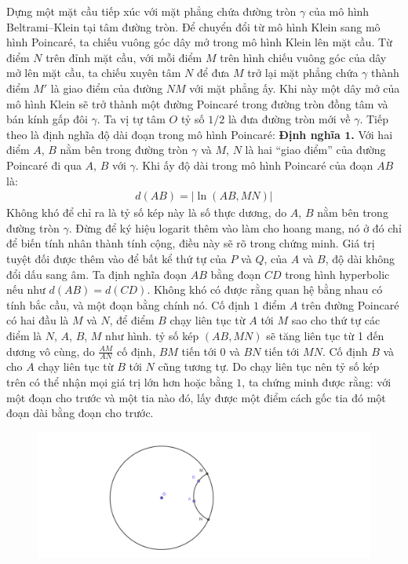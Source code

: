 \begin{multicols}{2}
\begin{figure}[H]
		\vspace*{-15pt}
	\end{figure}
	Dựng một mặt cầu tiếp xúc với mặt phẳng chứa đường tròn $\gamma$ của mô hình Beltrami--Klein tại tâm đường tròn. Để chuyển đổi từ mô hình Klein sang mô hình Poincar\'e, ta chiếu vuông góc dây mở trong mô hình Klein lên mặt cầu. Từ điểm $N$ trên đỉnh mặt cầu, với mỗi điểm $M$ trên hình chiếu vuông góc của dây mở lên mặt cầu, ta chiếu xuyên tâm $N$ để đưa $M$ trở lại mặt phẳng chứa $\gamma$ thành điểm $M'$ là giao điểm của đường $NM$ với mặt phẳng ấy. Khi này một dây mở của mô hình Klein sẽ trở thành một đường Poincar\'e trong đường tròn đồng tâm và bán kính gấp đôi $\gamma$. Ta vị tự tâm $O$ tỷ số $1/2$  là đưa đường tròn mới về $\gamma$.
	\vskip 0.1cm
	Tiếp theo là định nghĩa độ dài đoạn trong mô hình Poincar\'e:
	\vskip 0.1cm
	\textbf{\color{lichsutoanhoc}Định nghĩa $\pmb{1}$.}  Với hai điểm $A$, $B$ nằm bên trong đường tròn $\gamma$ và $M$, $N$ là hai ``giao điểm” của đường Poincar\'e đi qua $A$, $B$ với $\gamma$. Khi ấy độ dài trong mô hình Poincar\'e của đoạn $AB$ là:
	\begin{align*}
		 d(AB) = |\ln{(AB, MN)}|
	\end{align*}
	Không khó để chỉ ra là tỷ số kép này là số thực dương, do $A$, $B$ nằm bên trong đường tròn $\gamma$. Đừng để ký hiệu logarit thêm vào làm cho hoang mang, nó ở đó chỉ để biến tính nhân thành tính cộng, điều này sẽ rõ trong chứng minh. Giá trị tuyệt đối được thêm vào để bất kể thứ tự của $P$ và $Q$, của $A$ và $B$, độ dài không đổi dấu sang âm.
	\vskip 0.1cm
	Ta định nghĩa đoạn $AB$ bằng đoạn $CD$ trong hình hyperbolic nếu như $d(AB) = d(CD)$. Không khó có được rằng quan hệ bằng nhau có tính bắc cầu, và một đoạn bằng chính nó.
	Cố định $1$ điểm $A$ trên đường Poincar\'e có hai đầu là $M$ và $N$, để điểm $B$ chạy liên tục từ $A$ tới $M$ sao cho thứ tự các điểm là $N$, $A$, $B$, $M$ như hình. tỷ số kép $(AB, MN)$ sẽ tăng liên tục từ 1 đến dương vô cùng, do $\frac{AM}{AN}$ cố định, $BM$ tiến tới $0$ và $BN$ tiến tới $MN$. Cố định $B$ và cho $A$ chạy liên tục từ $B$ tới $N$ cũng tương tự. Do chạy liên tục nên tỷ số kép trên có thể nhận mọi giá trị lớn hơn hoặc bằng $1$, ta chứng minh được rằng: với một đoạn cho trước và một tia nào đó, lấy được một điểm cách gốc tia đó một đoạn dài bằng đoạn cho trước.
	\begin{figure}[H]
		\vspace*{-5pt}
		\centering
		\captionsetup{labelformat= empty, justification=centering}
		\includegraphics[width= 0.8\linewidth]{Tiende_NTDQ_1.pdf}

\end{figure}
\end{multicols}
